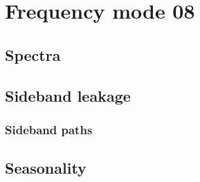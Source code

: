 \section{Frequency mode 08}
\subsection{Spectra}

\subsection{Sideband leakage}
\subsubsection{Sideband paths}

\subsection{Seasonality}

